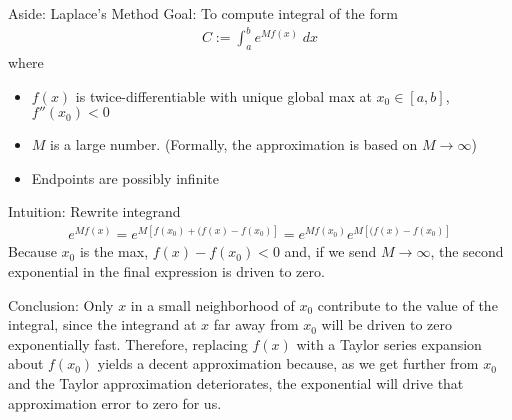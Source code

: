 \documentclass[aspectratio=169, handout]{beamer}
\newcommand{\ra}{\rightarrow}
\begin{document}
{\scriptsize
\begin{frame}{Aside: Laplace's Method}
\alert{Goal}: To compute integral of the form
\begin{align*}
  C
  :=
  \int_a^b e^{Mf(x)}\;dx
\end{align*}
where
\begin{itemize}
  \item $f(x)$ is twice-differentiable
    with unique global max at $x_0\in[a,b]$,
    $f''(x_0)<0$
  \item $M$ is a large number.
    (Formally, the approximation is based on $M\ra\infty$)
  \item Endpoints are possibly infinite
\end{itemize}
\alert{Intuition}:
Rewrite integrand
\begin{align*}
  e^{Mf(x)}
  =
  e^{M[f(x_0)+(f(x)-f(x_0)]}
  =
  e^{Mf(x_0)}
  e^{M[(f(x)-f(x_0)]}
\end{align*}
Because $x_0$ is the max, $f(x)-f(x_0)<0$ and, if we send $M\ra\infty$,
the second exponential in the final expression is driven to zero.

\alert{Conclusion}:
Only $x$ in a small neighborhood of $x_0$ contribute to the value of the
integral, since the integrand at $x$ far away from $x_0$ will be driven
to zero exponentially fast.
Therefore, replacing $f(x)$ with a Taylor series expansion about
$f(x_0)$ yields a decent approximation because, as we get further from
$x_0$ and the Taylor approximation deteriorates, the exponential will
drive that approximation error to zero for us.
\end{frame}
}
\end{document}
